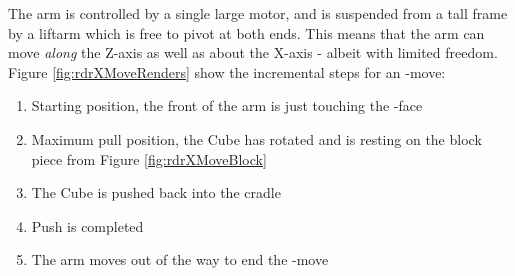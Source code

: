 \documentclass{report}
\newcommand{\tit}[1]{\textit{#1}}
\newcommand{\face}[1]{\uppercase{\texttt{\formatmovesnospace{#1}}}-face}
\newcommand{\move}[1]{\uppercase{\texttt{\formatmovesnospace{#1}}}-move}
\begin{document}
    The arm is controlled by a single large motor, and is suspended from a tall frame by a liftarm which is free to pivot at both ends. This means that the arm can move \tit{along} the Z-axis as well as about the X-axis - albeit with limited freedom. Figure \ref{fig:rdrXMoveRenders} show the incremental steps for an \move{x}: 
    
    \begin{enumerate}[label=\alph*]
    	\item Starting position, the front of the arm is just touching the \face{f}
    	\item Maximum pull position, the Cube has rotated and is resting on the block piece from Figure \ref{fig:rdrXMoveBlock}
    	\item The Cube is pushed back into the cradle
    	\item Push is completed
    	\item The arm moves out of the way to end the \move{x}
    \end{enumerate}
    
\end{document}
